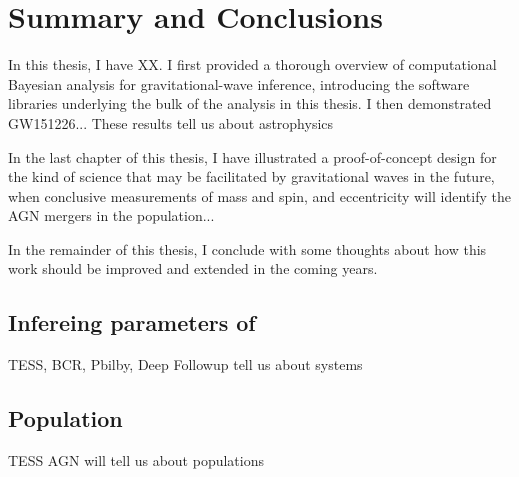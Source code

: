 \chapter{Summary and Conclusions}
\label{cp.conc}
In this thesis, I have XX.
I first provided a thorough overview of computational Bayesian analysis for gravitational-wave inference, introducing the software libraries underlying the bulk of the analysis in this thesis.
I then demonstrated GW151226...
These results tell us about astrophysics

In the last chapter of this thesis, I have illustrated a proof-of-concept design for the kind of science that may be facilitated by gravitational waves in the future, when conclusive measurements of mass and spin, and eccentricity will identify the AGN mergers in the population...

In the remainder of this thesis, I conclude with some thoughts about how this work should be improved and extended in the coming years.

\section{Infereing parameters of }

TESS, BCR, Pbilby, Deep Followup tell us about systems

\section{Population}
TESS AGN will tell us about populations
